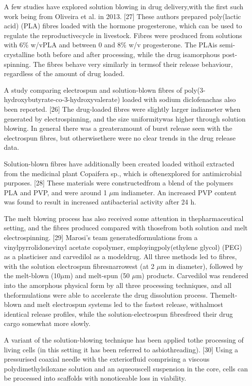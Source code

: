 \documentclass[5p,,preprint,12pt,twocolumn]{elsarticle}
\begin{document}
A few studies have explored solution blowing in drug delivery,with the first such work being from Oliveira et al. in 2013. [27] These authors prepared poly(lactic acid) (PLA) fibres loaded with the hormone progesterone, which can be used to regulate the reproductivecycle in livestock. Fibres were produced from solutions with 6\% w/vPLA and between 0 and 8\% w/v progesterone. The PLAis semi-crystalline both before and after processing, while the drug isamorphous post-spinning. The fibres behave very similarly in termsof their release behaviour, regardless of the amount of drug loaded.

A study comparing electrospun and solution-blown fibres of poly(3-hydroxybutyrate-co-3-hydroxyvalerate) loaded with sodium diclofenachas also been reported. [26] The drug-loaded fibres were slightly larger indiameter when generated by electrospinning, and the size uniformitywas higher through solution blowing. In general there was a greateramount of burst release seen with the electrospun fibres, but otherwisethere were no clear trends in the drug release data.

Solution-blown fibres have additionally been created loaded withoil extracted from the medicinal plant Copaifera sp., which is oftenexplored for antimicrobial purposes. [28] These materials were constructedfrom a blend of the polymers PLA and PVP, and were around 1 \ensuremath{\mu}m indiameter. An increased PVP content was found to result in increased antibacterial activity after 24 h.

The melt blowing process has also received some attention in thepharmaceutical setting, and the fibres produced compared with thosefrom both solution and melt electrospinning. [29] Marosi's team generatedformulations from a vinylpyrrolidone{\textendash}vinyl acetate copolymer, employingpoly(ethylene glycol) (PEG) as a plasticiser and carvedilol as a modeldrug. All three methods led to fibres, with the solution electrospun fibresnarrowest (at 2 \ensuremath{\mu}m in diameter), followed by the melt-blown (10\ensuremath{\mu}m) and melt-spun (50 \ensuremath{\mu}m) products. Carvedilol was rendered into the amorphous physical form by all three processing techniques, and all theformulations were able to accelerate the drug dissolution process. Themelt-blown and melt electrospun systems led to the fastest release, withalmost identical release profiles, while the solution-electrospun fibresfreed their drug cargo somewhat more slowly.

A variant of the solution-blowing technique has been applied tothe processing of living cells (in this setting it has been referred to asbiothreading). [30] Using a pressurised coaxial needle with the exteriorfluid comprising a viscous polydimethylsiloxane solution and an aqueouscell suspension in the core, cells can be processed into scaffolds with nonoticeable loss in viability.
\end{document}
